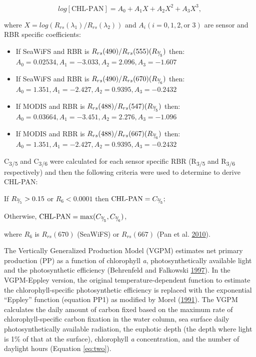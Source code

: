 \documentclass[
]{book}
\providecommand{\tightlist}{%
  \setlength{\itemsep}{0pt}\setlength{\parskip}{0pt}}
\begin{document}
\begin{equation}
log[\textrm{CHL-PAN}] = A_{0} + A_{1}X + A_{2}X^{2} + A_{3}X^{3},  
\label{eq:one} 
\end{equation}

where \(X = log(R_{rs}(\lambda_{1})/R_{rs}(\lambda_{2}))\) and \(A_{i} (i = 0, 1, 2, \textrm{or } 3)\) are sensor and RBR specific coefficients:

\begin{itemize}
\tightlist
\item
  If SeaWiFS and RBR is \(R_{rs}(490)/R_{rs}(555)(R_{^3{\mskip -5mu/\mskip -3mu}_5})\) then: \(A_0=0.02534, A_1=-3.033, A_2=2.096, A_3=-1.607\)
\item
  If SeaWiFS and RBR is \(R_{rs}(490)/R_{rs}(670)(R_{^3{\mskip -5mu/\mskip -3mu}_6})\) then: \(A_0=1.351, A_1=-2.427, A_2=0.9395, A_3=-0.2432\)
\item
  If MODIS and RBR is \(R_{rs}(488)/R_{rs}(547)(R_{^3{\mskip -5mu/\mskip -3mu}_5})\) then: \(A_0=0. 03664, A_1=-3.451, A_2=2.276, A_3=-1.096\)
\item
  If MODIS and RBR is \(R_{rs}(488)/R_{rs}(667)(R_{^3{\mskip -5mu/\mskip -3mu}_6})\) then: \(A_0=1.351, A_1=-2.427, A_2=0.9395, A_3=-0.2432\)
\end{itemize}

C\textsubscript{3/5} and C\textsubscript{3/6} were calculated for each sensor specific RBR (R\textsubscript{3/5} and R\textsubscript{3/6} respectively) and then the following criteria were used to determine to derive CHL-PAN:

If \(R_{^3{\mskip -5mu/\mskip -3mu}_5}>0.15\) or \(R_{6} <0.0001\) then \(\textrm{CHL-PAN} = C_{^3{\mskip -5mu/\mskip -3mu}_5};\)

Otherwise, \(\textrm{CHL-PAN} = \textrm{max}(C_{^3{\mskip -5mu/\mskip -3mu}_5}, C_{^3{\mskip -5mu/\mskip -3mu}_6})\),

where \(R_6\) is \(R_{rs}(670)\) (SeaWiFS) or \(R_{rs}(667)\) (Pan et al. \protect\hyperlink{ref-SOE13}{2010}).

The Vertically Generalized Production Model (VGPM) estimates net primary production (PP) as a function of chlorophyll \emph{a}, photosynthetically available light and the photosynthetic efficiency (Behrenfeld and Falkowski \protect\hyperlink{ref-SOE1}{1997}). In the VGPM-Eppley version, the original temperature-dependent function to estimate the chlorophyll-specific photosynthetic efficiency is replaced with the exponential ``Eppley'' function (equation PP1) as modified by Morel (\protect\hyperlink{ref-SOE7}{1991}). The VGPM calculates the daily amount of carbon fixed based on the maximum rate of chlorophyll-specific carbon fixation in the water column, sea surface daily photosynthetically available radiation, the euphotic depth (the depth where light is 1\% of that at the surface), chlorophyll \emph{a} concentration, and the number of daylight hours (Equation \eqref{eq:two}).
\end{document}
